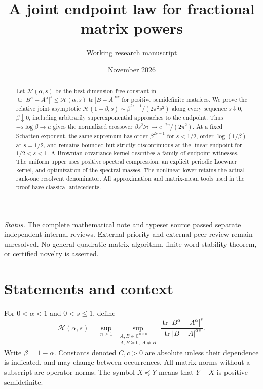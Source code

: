 \documentclass[11pt]{article}
\title{A joint endpoint law for fractional matrix powers}
\author{Working research manuscript}
\date{November 2026}
\numberwithin{equation}{section}
\newcommand{\tr}{\operatorname{tr}}
\newcommand{\C}{\mathbb C}
\newcommand{\cH}{\mathcal H}
\begin{document}
\maketitle

\begin{abstract}
Let $\cH(\alpha,s)$ be the best dimension-free constant in
$\tr|B^\alpha-A^\alpha|^s\le
\cH(\alpha,s)\tr|B-A|^{\alpha s}$ for positive semidefinite matrices.
We prove the relative joint asymptotic
$\cH(1-\beta,s)\sim\beta^{2s-1}/(2\pi^2s^2)$ along every sequence
$s\downarrow0$, $\beta\downarrow0$, including arbitrarily
superexponential approaches to the endpoint. Thus
$-s\log\beta\to u$ gives the normalized crossover
$\beta s^2\cH\to e^{-2u}/(2\pi^2)$.
At a fixed Schatten exponent, the same supremum has order
$\beta^{2s-1}$ for $s<1/2$, order $\log(1/\beta)$ at $s=1/2$,
and remains bounded but strictly discontinuous at the linear endpoint
for $1/2<s<1$. A Brownian covariance kernel describes a family of
endpoint witnesses. The uniform upper uses positive spectral
compression, an explicit periodic Loewner kernel, and optimization
of the spectral masses. The nonlinear lower retains the actual
rank-one resolvent denominator. All approximation and matrix-mean
tools used in the proof have classical antecedents.
\end{abstract}

\noindent\textit{Status.}
The complete mathematical note and typeset source passed separate
independent internal reviews. External priority and external peer review
remain unresolved. No general quadratic matrix algorithm, finite-word
stability theorem, or certified novelty is asserted.

\section{Statements and context}

For $0<\alpha<1$ and $0<s\le1$, define
\begin{equation}\label{eq:H}
 \cH(\alpha,s)=
 \sup_{n\ge1}\ \sup_{\substack{A,B\in\C^{n\times n}\\
                         A,B\succeq0,\ A\ne B}}
 \frac{\tr|B^\alpha-A^\alpha|^s}{\tr|B-A|^{\alpha s}}.
\end{equation}
Write $\beta=1-\alpha$. Constants denoted $C,c>0$ are absolute unless
their dependence is indicated, and may change between occurrences.
All matrix norms without a subscript are operator norms. The symbol
$X\preceq Y$ means that $Y-X$ is positive semidefinite.
\end{document}
